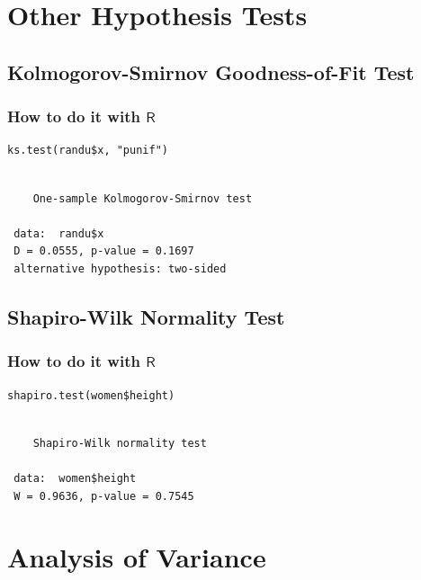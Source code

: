 \documentclass[captions=tableheading]{scrbook}
\begin{document}
\section{Other Hypothesis Tests}
\label{sec-10-5}
\label{sec-Other-Hypothesis-Tests}
\subsection{Kolmogorov-Smirnov Goodness-of-Fit Test}
\label{sec-10-5-1}
\label{sub-Kolmogorov-Smirnov-Goodness-of-Fit-Test}
\subsubsection{How to do it with \(\mathsf{R}\)}
\label{sec-10-5-1-1}



\lstset{language=R}
\begin{lstlisting}
ks.test(randu$x, "punif")
\end{lstlisting}

\begin{verbatim}
 
 	One-sample Kolmogorov-Smirnov test
 
 data:  randu$x 
 D = 0.0555, p-value = 0.1697
 alternative hypothesis: two-sided
\end{verbatim}
\subsection{Shapiro-Wilk Normality Test}
\label{sec-10-5-2}
\label{sub-Shapiro-Wilk-Normality-Test}
\subsubsection{How to do it with \(\mathsf{R}\)}
\label{sec-10-5-2-1}



\lstset{language=R}
\begin{lstlisting}
shapiro.test(women$height)
\end{lstlisting}

\begin{verbatim}
 
 	Shapiro-Wilk normality test
 
 data:  women$height 
 W = 0.9636, p-value = 0.7545
\end{verbatim}
\section{Analysis of Variance}
\label{sec-10-6}
\label{sec-Analysis-of-Variance}
\end{document}
